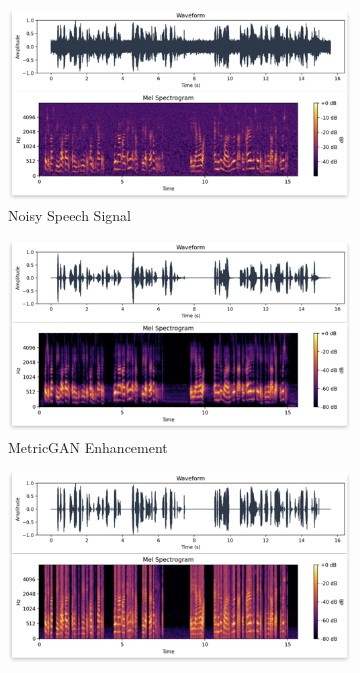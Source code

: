 \begin{figure}[H]
    \centering
         \begin{subfigure}[b]{0.3\textwidth}
             \centering
             \includegraphics[width=\textwidth]{figures/snr5_o.png}
             \caption{Noisy Speech Signal}
             \label{fig:y equals x}
         \end{subfigure}
         \hfill
         \begin{subfigure}[b]{0.3\textwidth}
             \centering
             \includegraphics[width=\textwidth]{figures/snr5_e.png}
             \caption{MetricGAN Enhancement}
             \label{fig:three sin x}
         \end{subfigure}
         \hfill
         \begin{subfigure}[b]{0.3\textwidth}
             \centering
             \includegraphics[width=\textwidth]{figures/snr5_w.png}

\end{subfigure}
\end{figure}

